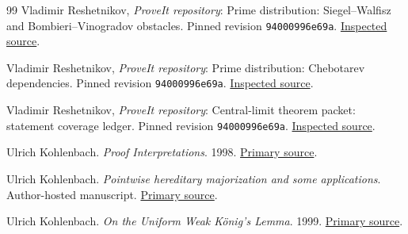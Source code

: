 \begin{thebibliography}{99}
 Vladimir Reshetnikov, \emph{ProveIt repository}: Prime distribution: Siegel--Walfisz and Bombieri--Vinogradov obstacles. Pinned revision \texttt{94000996e69a}. \href{https://github.com/VladimirReshetnikov/ProveIt/blob/94000996e69ab0c527393a1d02a4a037a4eb0493/Logic/PrimitiveRecursiveArithmetic/docs/proofs/analytic-number-theory/prime_distribution_ipra/paper/sections/07_sw_bv.tex}{Inspected source}.

 Vladimir Reshetnikov, \emph{ProveIt repository}: Prime distribution: Chebotarev dependencies. Pinned revision \texttt{94000996e69a}. \href{https://github.com/VladimirReshetnikov/ProveIt/blob/94000996e69ab0c527393a1d02a4a037a4eb0493/Logic/PrimitiveRecursiveArithmetic/docs/proofs/analytic-number-theory/prime_distribution_ipra/paper/sections/06_chebotarev.tex}{Inspected source}.

 Vladimir Reshetnikov, \emph{ProveIt repository}: Central-limit theorem packet: statement coverage ledger. Pinned revision \texttt{94000996e69a}. \href{https://github.com/VladimirReshetnikov/ProveIt/blob/94000996e69ab0c527393a1d02a4a037a4eb0493/Logic/PrimitiveRecursiveArithmetic/docs/proofs/probability/central_limit_ipra_2026-11-15/THEOREM_LEDGER.md}{Inspected source}.

 Ulrich Kohlenbach. \emph{Proof Interpretations}. 1998. \href{https://www.brics.dk/LS/98/1/}{Primary source}.

 Ulrich Kohlenbach. \emph{Pointwise hereditary majorization and some applications}. Author-hosted manuscript. \href{https://www2.mathematik.tu-darmstadt.de/~kohlenbach/point.pdf}{Primary source}.

 Ulrich Kohlenbach. \emph{On the Uniform Weak K\"onig's Lemma}. 1999. \href{https://www.brics.dk/RS/99/11/}{Primary source}.

\end{thebibliography}
